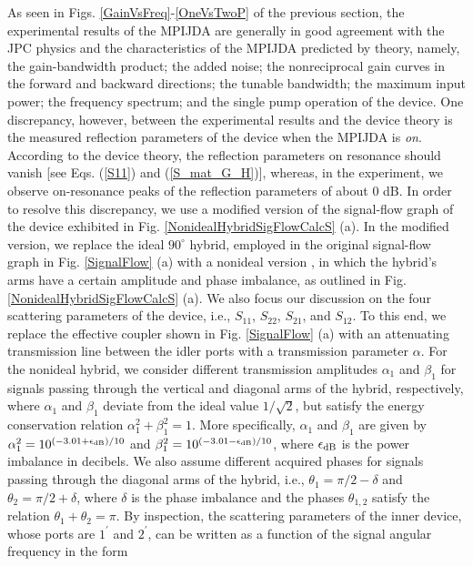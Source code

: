 \documentclass[aip,onecolumn,10pt]{revtex4}%
\begin{document}
As seen in Figs. \ref{GainVsFreq}-\ref{OneVsTwoP} of the previous section, the experimental results of the MPIJDA are generally in good agreement with the JPC physics and the characteristics of the MPIJDA predicted by theory, namely, the gain-bandwidth product; the added noise; the nonreciprocal gain curves in the forward and backward directions; the tunable bandwidth; the maximum input power; the frequency spectrum; and the single pump operation of the device. One discrepancy, however, between the experimental results and the device theory is the measured reflection parameters of the device when the MPIJDA is \textit{on}. According to the device theory, the reflection parameters on resonance should vanish [see Eqs. (\ref{S11}) and (\ref{S_mat_G_H})], whereas, in the experiment, we observe on-resonance peaks of the reflection parameters of about $0$ dB. In order to resolve this discrepancy, we use a modified version of the signal-flow graph of the device exhibited in Fig. \ref{NonidealHybridSigFlowCalcS} (a). In the modified version, we replace the ideal $90^{\circ}$ hybrid, employed in the original signal-flow graph in Fig. \ref{SignalFlow} (a) with a nonideal version \cite{Pozar}, in which the hybrid's arms have a certain amplitude and phase imbalance, as outlined in Fig. \ref{NonidealHybridSigFlowCalcS} (a). We also focus our discussion on the four scattering parameters of the device, i.e., $S_{11}$, $S_{22}$, $S_{21}$, and $S_{12}$. To this end, we replace the effective coupler shown in Fig. \ref{SignalFlow} (a) with an attenuating transmission line between the idler ports with a transmission parameter $\alpha$. For the nonideal hybrid, we consider different transmission amplitudes $\alpha_1$ and $\beta_1$ for signals passing through the vertical and diagonal arms of the hybrid, respectively, where $\alpha_1$ and $\beta_1$ deviate from the ideal value $1/\sqrt2$, but satisfy the energy conservation relation $\alpha_1^2+\beta_1^2=1$. More specifically, $\alpha_1$ and $\beta_1$ are given by $\alpha_1^2=10^{(-3.01+\epsilon_{\rm{dB}})/10}$ and $\beta_1^2=10^{(-3.01-\epsilon_{\rm{dB}})/10}$, where $\epsilon_{\rm{dB}}$ is the power imbalance in decibels. We also assume different acquired phases for signals passing through the diagonal arms of the hybrid, i.e., $\theta_1=\pi/2-\delta$ and $\theta_2=\pi/2+\delta$, where $\delta$ is the phase imbalance and the phases $\theta_{1,2}$ satisfy the relation $\theta_1+\theta_2=\pi$. By inspection, the scattering parameters of the inner device, whose ports are $1^{\prime}$ and $2^{\prime}$, can be written as a function of the signal angular frequency in the form       
\end{document}
